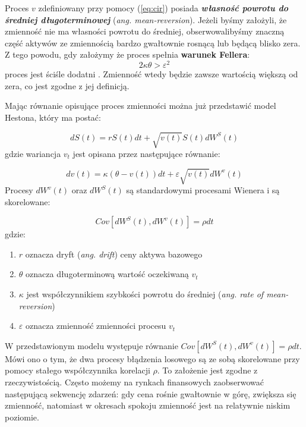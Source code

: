 \documentclass{pracamgr}
\begin{document}
Proces $v$ zdefiniowany przy pomocy (\ref{eq:cir}) posiada 
\textbf{\textit{własność powrotu do średniej długoterminowej}} (\textit{ang. mean-reversion}). 
Jeżeli byśmy założyli, że zmienność nie ma własności powrotu do średniej, obserwowalibyśmy 
znaczną część aktywów ze zmiennością bardzo gwałtownie rosnącą lub będącą blisko zera.
Z tego powodu, gdy założymy że proces spełnia \textbf{warunek Fellera}:
\begin{equation}
2 \kappa \theta > \varepsilon^2
\end{equation}
proces jest ściśle dodatni \cite{TheLittleHestonTrap}. Zmienność wtedy będzie zawsze wartością większą
od zera, co jest zgodne z jej definicją.

Mając równanie opisujące proces zmienności można już przedstawić model Hestona, który ma postać:

\begin{equation}
\label{eq:heston1}
dS(t)  = r S(t) dt + \sqrt{v(t)} S(t) dW^S(t)
\end{equation}
gdzie wariancja $v_t$ jest opisana przez następujące równanie: 

\begin{equation}
\label{eq:heston2}
dv(t)  = \kappa (\theta - v(t))dt + \varepsilon \sqrt{v(t)} dW^v(t) 
\end{equation}
Procesy $dW^v(t)$ oraz $dW^S(t)$ są standardowymi procesami 
Wienera i są 
skorelowane:

\begin{equation}
Cov[dW^S(t), dW^v(t)] = \rho dt 
\end{equation}
gdzie:

\begin{enumerate}
\item $r$ oznacza dryft (\textit{ang. drift}) ceny aktywa bazowego 
\item $\theta$ oznacza długoterminową wartość oczekiwaną $v_t$
\item $\kappa$ jest współczynnikiem szybkości powrotu do średniej (\textit{ang. rate of mean-reversion})
\item $\varepsilon$ oznacza zmienność zmienności procesu $v_t$
\end{enumerate}

W przedstawionym modelu występuje równanie $Cov[dW^S(t), dW^v(t)] = \rho dt $. Mówi ono o tym, że 
dwa procesy błądzenia losowego są ze sobą skorelowane przy pomocy stałego 
współczynnika korelacji $\rho$.
To założenie jest zgodne z rzeczywistością. Często możemy na rynkach finansowych zaobserwować 
następującą sekwencję zdarzeń: gdy cena rośnie gwałtownie w górę, zwiększa się zmienność, 
natomiast w okresach spokoju zmienność jest na relatywnie niskim poziomie.
\end{document}
